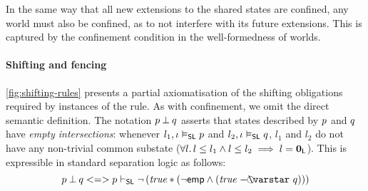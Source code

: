 In the same way that all new extensions to the shared states are confined, any world
must also be confined, as to not interfere with its future extensions. This is captured by the confinement condition in the well-formedness of worlds.


\paragraph{Shifting and fencing}
\fig\ref{fig:shifting-rules} presents a partial axiomatisation of the
shifting obligations required by instances of the \shiftRule rule. As
with confinement, we omit the direct semantic definition.
The notation $\separate{\lass{P}}{\lass{Q}}$ asserts that
states described by $\lass{P}$ and $\lass{Q}$ have \emph{empty
  intersections}: whenever $l_1, \lenv \slsat \lass{P}$ and $l_2,
\lenv \slsat \lass{Q}$, $l_1$ and $l_2$ do not have any non-trivial
common substate ($\forall l.\, l \leq l_1 \land l \leq l_2 \implies l =
\mathbf{0}_{\mathsf{L}}$). This is expressible in standard separation logic as follows:
\[
\separate{\lass{P}}{\lass{Q}} <=> \lass{P} \slentails \neg\left( \m{true} * (\neg\emp \land (\m{true} \septraction \lass{Q}) ) \right)
\]

